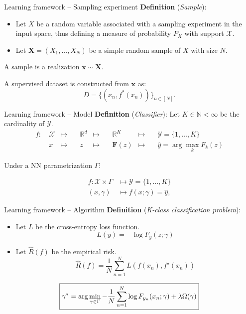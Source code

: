 \begin{frame}{Learning framework -- Sampling experiment}
	\textbf{Definition} (\textit{Sample}): 
	\begin{itemize}
		\item Let $X$ be a random variable associated with a sampling 
		experiment in the input space, thus defining a measure of 
		probability $P_X$ with support $\mathcal{X}$.
		\item Let $\bm{X} = (X_1, ..., X_N)$ be a simple
		random sample of $X$ with size $N$. \\
	\end{itemize}
	A sample is a realization $\bm{x} \sim \bm{X}$.

	\vspace{0.5cm}
	A supervised dataset is constructed from $\bm{x}$ as:
	$$
	D = \{(x_n, f^*(x_n))\}_{n \in [N]}.
	$$
\end{frame}

\begin{frame}{Learning framework -- Model}
	\textbf{Definition} (\textit{Classifier}): Let $K \in \mathbb{N} < \infty$ be the cardinality of $\mathcal{Y}$.
	$$
	\begin{aligned}
	f:\ & \mathcal{X} & \longmapsto & \quad \mathbb{R}^d & \longmapsto & \quad \mathbb{R}^K & \longmapsto & \quad \mathcal{Y} = \{1, \dots, K\} \\
		& x           & \longmapsto & \quad z & \longmapsto & \quad \bm{F}(z)    & \longmapsto & \quad \hat{y} = \arg \max_{k} F_k(z)
	\end{aligned}
	$$

	Under a NN parametrization $\Gamma$:


	$$
        \begin{aligned}
        f: \mathcal{X} \times \Gamma & \longmapsto \mathcal{Y} = \{1, \dots, K \} \\
        (x, \gamma) & \longmapsto f(x; \gamma) = \hat{y},
        \end{aligned}
    $$
\end{frame}


\begin{frame}{Learning framework -- Algorithm}
	\textbf{Definition} (\textit{K-class classification problem}):
	\begin{itemize}
		\item Let $L$ be the cross-entropy loss function.
		$$
		L(y) = - \log F_y(z; \gamma)
		$$
		\item Let $\hat{R}(f)$ be the empirical risk.
		$$
		\hat{R}(f)=\frac{1}{N}\sum_{n=1}^{N}L(f(x_{n}),f^{\star}(x_{n}))
		$$
	\end{itemize}

	$$
	\textcolor{black}{
        \boxed{
            \gamma^* = \arg \min_{\gamma \in \Gamma} - \frac{1}{N}\sum_{n=1}^{N} \log F_{y_n}(x_n; \gamma) + \lambda \Omega(\gamma)
        }
    }
	$$
\end{frame}

